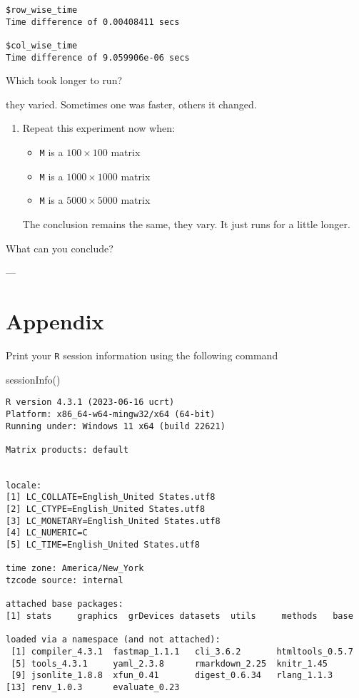 \documentclass[
  letterpaper,
  DIV=11,
  numbers=noendperiod]{scrartcl}
\newenvironment{Shaded}{\begin{snugshade}}{\end{snugshade}}
\newcommand{\FunctionTok}[1]{\textcolor[rgb]{0.28,0.35,0.67}{#1}}
\newcommand{\NormalTok}[1]{\textcolor[rgb]{0.00,0.23,0.31}{#1}}
\providecommand{\tightlist}{%
  \setlength{\itemsep}{0pt}\setlength{\parskip}{0pt}}\usepackage{longtable,booktabs,array}
\begin{document}
\begin{verbatim}
$row_wise_time
Time difference of 0.00408411 secs

$col_wise_time
Time difference of 9.059906e-06 secs
\end{verbatim}

Which took longer to run?

they varied. Sometimes one was faster, others it changed.

\begin{enumerate}
\def\labelenumi{\arabic{enumi}.}
\setcounter{enumi}{5}
\item
  Repeat this experiment now when:

  \begin{itemize}
  \tightlist
  \item
    \texttt{M} is a \(100 \times 100\) matrix
  \item
    \texttt{M} is a \(1000 \times 1000\) matrix
  \item
    \texttt{M} is a \(5000 \times 5000\) matrix
  \end{itemize}

  The conclusion remains the same, they vary. It just runs for a little
  longer.
\end{enumerate}

What can you conclude?

---

\hypertarget{appendix}{%
\section{Appendix}\label{appendix}}

Print your \texttt{R} session information using the following command

\begin{Shaded}
\begin{Highlighting}[]
\FunctionTok{sessionInfo}\NormalTok{()}
\end{Highlighting}
\end{Shaded}

\begin{verbatim}
R version 4.3.1 (2023-06-16 ucrt)
Platform: x86_64-w64-mingw32/x64 (64-bit)
Running under: Windows 11 x64 (build 22621)

Matrix products: default


locale:
[1] LC_COLLATE=English_United States.utf8 
[2] LC_CTYPE=English_United States.utf8   
[3] LC_MONETARY=English_United States.utf8
[4] LC_NUMERIC=C                          
[5] LC_TIME=English_United States.utf8    

time zone: America/New_York
tzcode source: internal

attached base packages:
[1] stats     graphics  grDevices datasets  utils     methods   base     

loaded via a namespace (and not attached):
 [1] compiler_4.3.1  fastmap_1.1.1   cli_3.6.2       htmltools_0.5.7
 [5] tools_4.3.1     yaml_2.3.8      rmarkdown_2.25  knitr_1.45     
 [9] jsonlite_1.8.8  xfun_0.41       digest_0.6.34   rlang_1.1.3    
[13] renv_1.0.3      evaluate_0.23  
\end{verbatim}
\end{document}
